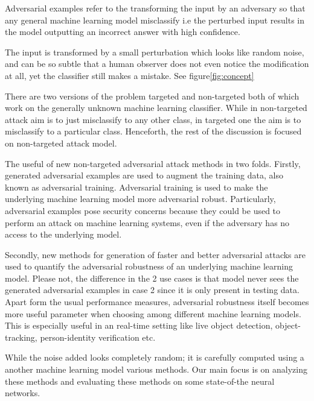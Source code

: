 \documentclass[letterpaper]{article}
\begin{document}
\noindent Adversarial examples refer to the transforming the input by an adversary so that any general machine learning model misclassify i.e the perturbed input results in the model outputting an incorrect answer with high confidence.

The input is transformed by a small perturbation which looks like random noise, and can be so subtle that a human observer does not even notice the modification at all, yet the classifier still makes a mistake. See figure\ref{fig:concept}

There are two versions of the problem targeted and non-targeted both of which work on the generally unknown machine learning classifier. While in non-targeted attack aim is to just misclassify to any other class, in targeted one the aim is to misclassify to a particular class. Henceforth, the rest of the discussion is focused on non-targeted attack model.

The useful of new non-targeted adversarial attack methods in two folds. Firstly, generated adversarial examples are used to augment the training data, also known as adversarial training. Adversarial training is used to make the underlying machine learning model more adversarial robust.  Particularly, adversarial examples pose security concerns because they could be used to perform an attack on machine learning systems, even if the adversary has no access to the underlying model.

Secondly, new methods for generation of faster and better adversarial attacks are used to quantify the adversarial robustness of an underlying machine learning model.
Please not, the difference in the 2 use cases is that model never sees the generated adversarial examples in case 2 since it is only present in testing data. Apart form the usual performance measures, adversarial robustness itself becomes more useful parameter when choosing among different machine learning models. This is especially useful in an real-time setting like live object detection, object-tracking, person-identity verification etc.

While the noise added looks completely random; it is carefully computed using a another machine learning model various methods. Our main focus is on analyzing these methods and evaluating these methods on some state-of-the neural networks.
\end{document}
